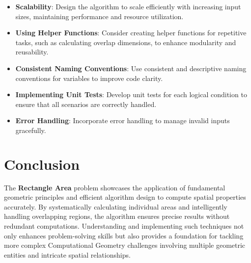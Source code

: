 \begin{itemize}
    \item \textbf{Scalability}: Design the algorithm to scale efficiently with increasing input sizes, maintaining performance and resource utilization.
    
    \item \textbf{Using Helper Functions}: Consider creating helper functions for repetitive tasks, such as calculating overlap dimensions, to enhance modularity and reusability.
    
    \item \textbf{Consistent Naming Conventions}: Use consistent and descriptive naming conventions for variables to improve code clarity.
    
    \item \textbf{Implementing Unit Tests}: Develop unit tests for each logical condition to ensure that all scenarios are correctly handled.
    
    \item \textbf{Error Handling}: Incorporate error handling to manage invalid inputs gracefully.
\end{itemize}

\section*{Conclusion}

The \textbf{Rectangle Area} problem showcases the application of fundamental geometric principles and efficient algorithm design to compute spatial properties accurately. By systematically calculating individual areas and intelligently handling overlapping regions, the algorithm ensures precise results without redundant computations. Understanding and implementing such techniques not only enhances problem-solving skills but also provides a foundation for tackling more complex Computational Geometry challenges involving multiple geometric entities and intricate spatial relationships.

\printindex

% 
% 
% 
% 